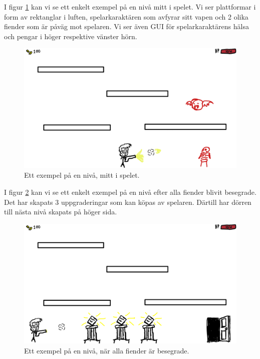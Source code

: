 \documentclass{TDP005mall}
\begin{document}
I figur \ref{fig:1} kan vi se ett enkelt exempel på en nivå mitt i spelet. Vi ser plattformar i form av rektanglar i luften, spelarkaraktären som avfyrar sitt vapen och 2 olika fiender som är påväg mot spelaren. Vi ser även GUI för spelarkaraktärens hälsa och pengar i höger respektive vänster hörn.
\begin{figure}[H]
         \begin{center}
             \includegraphics[width=15cm]{Graphic/main_concept.png}
             \caption{\label{fig:1} Ett exempel på en nivå, mitt i spelet.}
         \end{center}
\end{figure}

I figur \ref{fig:2} kan vi se ett enkelt exempel på en nivå efter alla fiender blivit besegrade. Det har skapats 3 uppgraderingar som kan köpas av spelaren. Därtill har dörren till nästa nivå skapats på höger sida.
\begin{figure}[H]
         \begin{center}
             \includegraphics[width=15cm]{Graphic/win_concept.png}
             \caption{\label{fig:2} Ett exempel på en nivå, när alla fiender är besegrade.}
         \end{center}
\end{figure}
\end{document}
